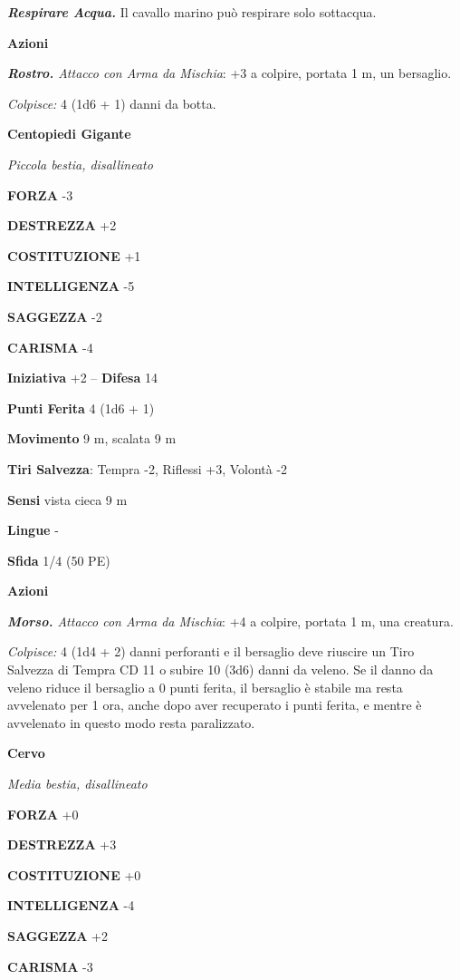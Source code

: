 \begin{multicols}{2}
\emph{\textbf{Respirare Acqua.}} Il cavallo marino può respirare solo sottacqua.

\textbf{Azioni}

\emph{\textbf{Rostro.} Attacco con Arma da Mischia}: +3 a colpire, portata 1 m, un bersaglio.

\emph{Colpisce:} 4 (1d6 + 1) danni da botta.

\medskip\textbf{Centopiedi Gigante}

\emph{Piccola bestia, disallineato}

\textbf{FORZA} -3

\textbf{DESTREZZA} +2

\textbf{COSTITUZIONE} +1

\textbf{INTELLIGENZA} -5

\textbf{SAGGEZZA} -2

\textbf{CARISMA} -4

\textbf{Iniziativa} +2 -- \textbf{Difesa} 14

\textbf{Punti Ferita} 4 (1d6 + 1)

\textbf{Movimento} 9 m, scalata 9 m

\textbf{Tiri Salvezza}: Tempra -2, Riflessi +3, Volontà -2 

\textbf{Sensi} vista cieca 9 m

\textbf{Lingue} -

\textbf{Sfida} 1/4 (50 PE)

\textbf{Azioni}

\emph{\textbf{Morso.} Attacco con Arma da Mischia}: +4 a colpire, portata 1 m, una creatura.

\emph{Colpisce:} 4 (1d4 + 2) danni perforanti e il bersaglio deve riuscire un Tiro Salvezza di Tempra CD 11 o subire 10 (3d6) danni da veleno. Se il danno da veleno riduce il bersaglio a 0 punti ferita, il bersaglio è stabile ma resta avvelenato per 1 ora, anche dopo aver recuperato i punti ferita, e mentre è avvelenato in questo modo resta paralizzato.

\medskip\textbf{Cervo}

\emph{Media bestia, disallineato}

\textbf{FORZA} +0

\textbf{DESTREZZA} +3

\textbf{COSTITUZIONE} +0

\textbf{INTELLIGENZA} -4

\textbf{SAGGEZZA} +2

\textbf{CARISMA} -3


\end{multicols}
